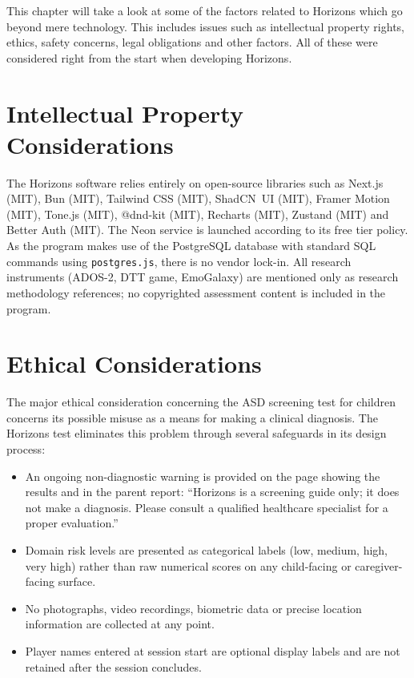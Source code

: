 \documentclass[12pt,a4paper,oneside]{report}
\begin{document}
	This chapter will take a look at some of the factors related to Horizons which go beyond mere technology. This includes issues such as intellectual property rights, ethics, safety concerns, legal obligations and other factors. All of these were considered right from the start when developing Horizons.
	
	\section{Intellectual Property Considerations}
	
	The Horizons software relies entirely on open-source libraries such as Next.js (MIT), Bun (MIT), Tailwind CSS (MIT), ShadCN~UI (MIT), Framer Motion (MIT), Tone.js (MIT), @dnd-kit (MIT), Recharts (MIT), Zustand (MIT) and Better Auth (MIT). The Neon service is launched according to its free tier policy. As the program makes use of the PostgreSQL database with standard SQL commands using \texttt{postgres.js}, there is no vendor lock-in. All research instruments (ADOS-2, DTT game, EmoGalaxy) are mentioned only as research methodology references; no copyrighted assessment content is included in the program.
	
	\newpage
	
	\section{Ethical Considerations}
	
	The major ethical consideration concerning the ASD screening test for children concerns its possible misuse as a means for making a clinical diagnosis. The Horizons test eliminates this problem through several safeguards in its design process:
	
	\begin{itemize}[leftmargin=0.5in]
		\item An ongoing non-diagnostic warning is provided on the page showing the results and in the parent report: “Horizons is a screening guide only; it does not make a diagnosis. Please consult a qualified healthcare specialist for a proper evaluation.''
		\item Domain risk levels are presented as categorical labels (low, medium, high, very high) rather than raw numerical scores on any child-facing or caregiver-facing surface.
		\item No photographs, video recordings, biometric data or precise location information are collected at any point.
		\item Player names entered at session start are optional display labels and are not retained after the session concludes.
	\end{itemize}
	
\end{document}
